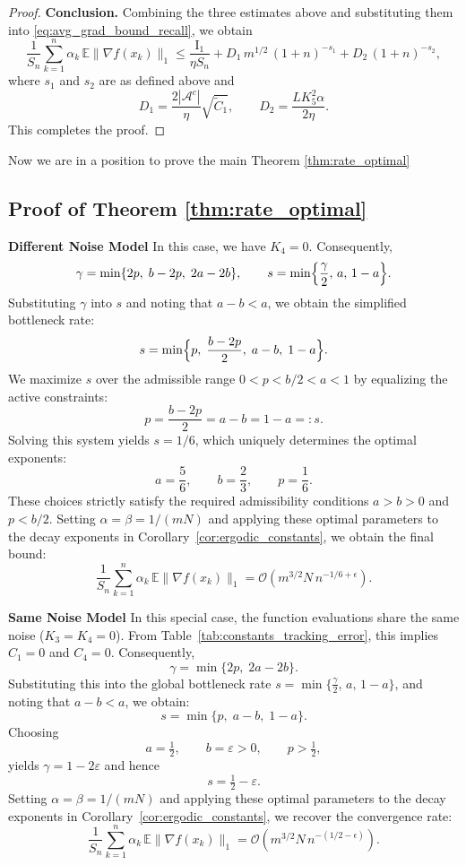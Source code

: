 \documentclass{article}
\begin{document}
\begin{proof}
\medskip\noindent\textbf{Conclusion.}
Combining the three estimates above and substituting them into
\eqref{eq:avg_grad_bound_recall}, we obtain
\[
\frac{1}{S_n}\sum_{k=1}^n \alpha_k\,\mathbb{E}\|\nabla f(x_k)\|_1
\le
\frac{\mathrm{I}_1}{\eta S_n}
+ D_1\, m^{1/2}\,(1+n)^{-s_1}
+ D_2\,(1+n)^{-s_2},
\]
where \(s_1\) and \(s_2\) are as defined above and
\[
D_1=\frac{2|\mathcal{A}^c|}{\eta}\sqrt{\widetilde C_1},
\qquad
D_2=\frac{L K_5^2 \alpha}{2\eta}.
\]
This completes the proof.
\end{proof}
Now we are in a position to prove the main Theorem \ref{thm:rate_optimal}

\subsection{Proof of Theorem \ref{thm:rate_optimal}}

\textbf{Different Noise Model}
In this case, we have $K_4=0$. Consequently,
$$
\gamma = \min\{2p,\; b-2p,\; 2a-2b\}, \qquad s = \min\Bigl\{\frac{\gamma}{2},\, a,\, 1-a\Bigr\}.
$$
Substituting $\gamma$ into $s$ and noting that $a-b < a$, we obtain the simplified bottleneck rate:
$$
s = \min\Bigl\{p,\; \frac{b-2p}{2},\; a-b,\; 1-a\Bigr\}.
$$
We maximize $s$ over the admissible range $0 < p < b/2 < a < 1$ by equalizing the active constraints:
$$
p = \frac{b-2p}{2} = a-b = 1-a =: s.
$$
Solving this system yields $s=1/6$, which uniquely determines the optimal exponents:
$$
a=\frac56, \qquad b=\frac23, \qquad p=\frac16.
$$
These choices strictly satisfy the required admissibility conditions $a>b>0$ and $p<b/2$. Setting $\alpha=\beta=1/(mN)$ and applying these optimal parameters to the decay exponents in Corollary~\ref{cor:ergodic_constants}, we obtain the final bound:
$$
\frac{1}{S_n}\sum_{k=1}^n \alpha_k\,\mathbb{E}\|\nabla f(x_k)\|_1 = \mathcal{O}\!\left(m^{3/2}N\,n^{-1/6+\epsilon}\right).
$$

\textbf{Same Noise Model}
In this special case, the function evaluations share the same noise ($K_3 = K_4 = 0$). From Table~\ref{tab:constants_tracking_error}, this implies $C_1 = 0$ and $C_4 = 0$. Consequently,
$$
\gamma = \min\{2p,\; 2a-2b\}.
$$
Substituting this into the global bottleneck rate $s = \min\bigl\{\frac{\gamma}{2},\, a,\, 1-a\bigr\}$, and noting that $a-b < a$, we obtain:
$$
s = \min\{p,\; a-b,\; 1-a\}.
$$
Choosing
\[
a=\tfrac12,\qquad b=\varepsilon>0,\qquad p>\tfrac12,
\]
yields \(\gamma=1-2\varepsilon\) and hence
\[
s=\tfrac12-\varepsilon.
\]
Setting $\alpha=\beta=1/(mN)$ and applying these optimal parameters to the decay exponents in Corollary~\ref{cor:ergodic_constants}, we recover the convergence rate:
$$
\frac{1}{S_n}\sum_{k=1}^n \alpha_k\,\mathbb{E}\|\nabla f(x_k)\|_1 = \mathcal{O}\!\left(m^{3/2}N\,n^{-(1/2-\epsilon)}\right).
$$
\end{document}
